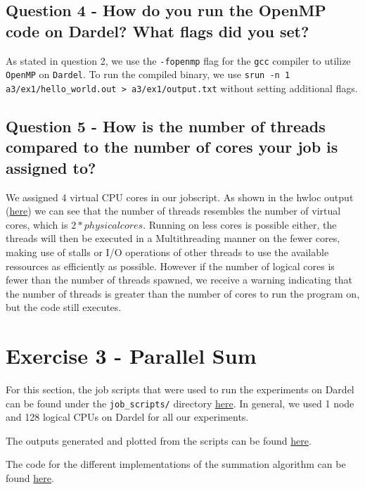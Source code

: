\documentclass[a4paper,10pt]{article}
\begin{document}
\subsection{Question 4 - How do you run the OpenMP code on Dardel? What flags did you set?}
As stated in question 2, we use the \verb|-fopenmp| flag for the \verb|gcc| compiler to utilize \verb|OpenMP| on \verb|Dardel|.
To run the compiled binary, we use \verb|srun -n 1 a3/ex1/hello_world.out > a3/ex1/output.txt| without setting additional flags.

\subsection{Question 5 - How is the number of threads compared to the number of cores your job is assigned to?}
We assigned 4 virtual CPU cores in our jobscript. As shown in the hwloc output (\href{https://github.com/paulmyr/DD2356-MethodsHPC/blob/master/3_open_mp/img/ex1/topology.svg}{here}) we can see that the number of threads resembles the number of virtual cores, which is $2 * physical cores$. Running on less cores is possible either, 
the threads will then be executed in a Multithreading manner on the fewer cores, making use of stalls or I/O operations of other threads to use the available ressources as efficiently as possible. However if the number of logical cores
is fewer than the number of threads spawned, we receive a warning indicating that the number of threads is greater than the number of cores to run the program on, but the code still executes.


\section{Exercise 3 - Parallel Sum}
For this section, the job scripts that were used to run the experiments on Dardel can be found under the \verb|job_scripts/| directory \href{https://github.com/paulmyr/DD2356-MethodsHPC/tree/master/3_open_mp/exercise3/job_scripts}{here}. In general, we used 1 node and 128 logical CPUs on Dardel for all our experiments. 

The outputs generated and plotted from the scripts can be found \href{https://github.com/paulmyr/DD2356-MethodsHPC/tree/master/3_open_mp/exercise3/outputs}{here}. 

The code for the different implementations of the summation algorithm can be found \href{https://github.com/paulmyr/DD2356-MethodsHPC/tree/master/3_open_mp/exercise3}{here}.
\end{document}
